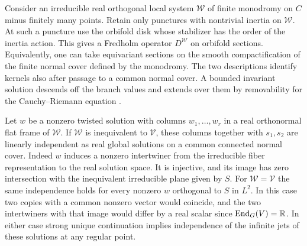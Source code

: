 Consider an irreducible real orthogonal local system $\mathcal W$
of finite monodromy on $C$ minus finitely many points. Retain only
punctures with nontrivial inertia on $\mathcal W$.
At such a puncture use the orbifold disk whose stabilizer has the
order of the inertia action. This gives a Fredholm operator
$D^{\mathcal W}$ on orbifold sections. Equivalently, one can take
equivariant sections on the smooth compactification of the finite
normal cover defined by the monodromy. The two descriptions identify
kernels also after passage to a common normal cover. A bounded
invariant solution descends off the branch values and extends over
them by removability for the Cauchy--Riemann equation
\cite[Propositions~2.7.3 and~2.8.3]{dwbn}.

Let $w$ be a nonzero twisted solution with columns $w_1,\ldots,w_r$
in a real orthonormal flat frame of $\mathcal W$. If $\mathcal W$ is
inequivalent to $\mathcal V$, these columns together with $s_1,s_2$
are linearly independent as real global solutions on a common
connected normal cover. Indeed $w$ induces a nonzero intertwiner
from the irreducible fiber representation to the real solution space.
It is injective, and its image has zero intersection with the
inequivalent irreducible plane given by $S$. For $\mathcal W=\mathcal V$
the same independence holds for every nonzero $w$ orthogonal to $S$
in $L^2$. In this case two copies with a common nonzero vector
would coincide, and the two intertwiners with that image would differ
by a real scalar since $\operatorname{End}_G(V)=\mathbb R$. In either case
strong unique continuation implies independence of the infinite
jets of these solutions at any regular point.

